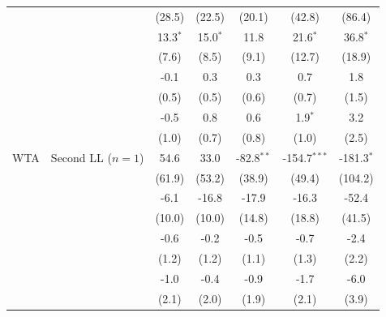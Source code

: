 \begin{tabular}{l l*{5}{c}}
  &  & (28.5) & (22.5) & (20.1) & (42.8) & (86.4) \\
  &  & 13.3$^{*}$ & 15.0$^{*}$ & 11.8 & 21.6$^{*}$ & 36.8$^{*}$ \\
  &  & (7.6) & (8.5) & (9.1) & (12.7) & (18.9) \\
  &  & -0.1 & 0.3 & 0.3 & 0.7 & 1.8 \\
  &  & (0.5) & (0.5) & (0.6) & (0.7) & (1.5) \\
  &  & -0.5 & 0.8 & 0.6 & 1.9$^{*}$ & 3.2 \\
  &  & (1.0) & (0.7) & (0.8) & (1.0) & (2.5) \\
[0.3em]
WTA & Second LL ($n=1$) & 54.6 & 33.0 & -82.8$^{**}$ & -154.7$^{***}$ & -181.3$^{*}$ \\
  &  & (61.9) & (53.2) & (38.9) & (49.4) & (104.2) \\
  &  & -6.1 & -16.8 & -17.9 & -16.3 & -52.4 \\
  &  & (10.0) & (10.0) & (14.8) & (18.8) & (41.5) \\
  &  & -0.6 & -0.2 & -0.5 & -0.7 & -2.4 \\
  &  & (1.2) & (1.2) & (1.1) & (1.3) & (2.2) \\
  &  & -1.0 & -0.4 & -0.9 & -1.7 & -6.0 \\
  &  & (2.1) & (2.0) & (1.9) & (2.1) & (3.9) \\
[0.3em]
\bottomrule
\end{tabular}
